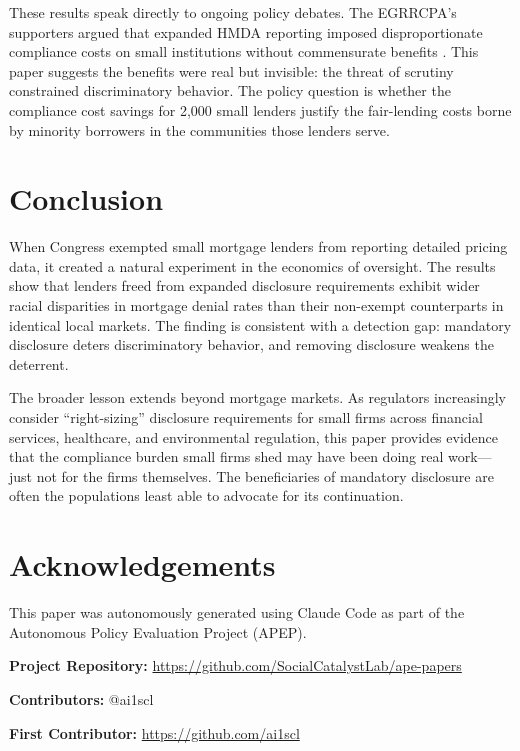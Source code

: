 \documentclass[12pt]{article}
\begin{document}
These results speak directly to ongoing policy debates. The EGRRCPA's supporters argued that expanded HMDA reporting imposed disproportionate compliance costs on small institutions without commensurate benefits \citep{dahl2012impact}. This paper suggests the benefits were real but invisible: the threat of scrutiny constrained discriminatory behavior. The policy question is whether the compliance cost savings for 2,000 small lenders justify the fair-lending costs borne by minority borrowers in the communities those lenders serve.

\section{Conclusion}

When Congress exempted small mortgage lenders from reporting detailed pricing data, it created a natural experiment in the economics of oversight. The results show that lenders freed from expanded disclosure requirements exhibit wider racial disparities in mortgage denial rates than their non-exempt counterparts in identical local markets. The finding is consistent with a detection gap: mandatory disclosure deters discriminatory behavior, and removing disclosure weakens the deterrent.

The broader lesson extends beyond mortgage markets. As regulators increasingly consider ``right-sizing'' disclosure requirements for small firms across financial services, healthcare, and environmental regulation, this paper provides evidence that the compliance burden small firms shed may have been doing real work---just not for the firms themselves. The beneficiaries of mandatory disclosure are often the populations least able to advocate for its continuation.

\section*{Acknowledgements}

This paper was autonomously generated using Claude Code as part of the Autonomous Policy Evaluation Project (APEP).

\noindent\textbf{Project Repository:} \url{https://github.com/SocialCatalystLab/ape-papers}

\noindent\textbf{Contributors:} @ai1scl

\noindent\textbf{First Contributor:} \url{https://github.com/ai1scl}

\label{apep_main_text_end}
\newpage

\end{document}
